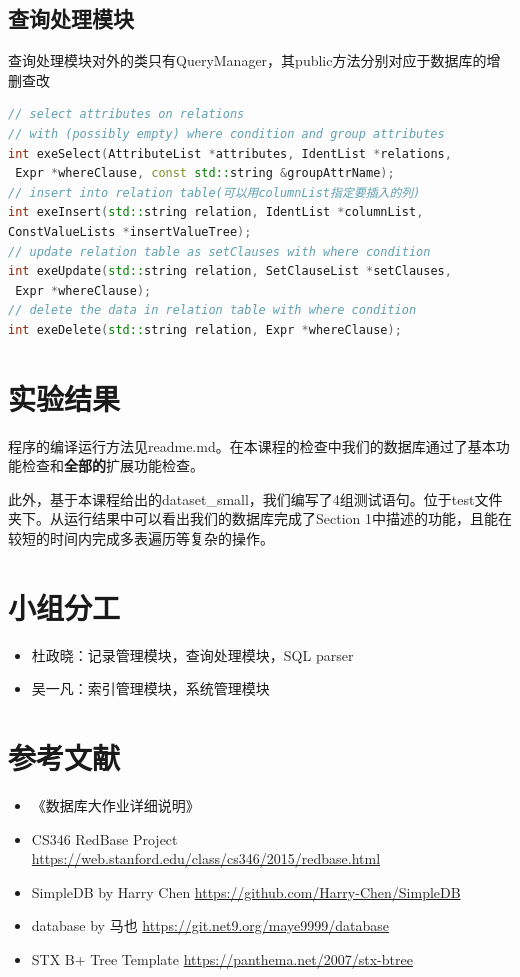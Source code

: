 \documentclass[11pt,UTF8]{report}
\begin{document}
\subsection{查询处理模块}
查询处理模块对外的类只有QueryManager，其public方法分别对应于数据库的增删查改
\begin{lstlisting}[language=C++]
// select attributes on relations 
// with (possibly empty) where condition and group attributes
int exeSelect(AttributeList *attributes, IdentList *relations,
 Expr *whereClause, const std::string &groupAttrName);
// insert into relation table(可以用columnList指定要插入的列)
int exeInsert(std::string relation, IdentList *columnList, 
ConstValueLists *insertValueTree);
// update relation table as setClauses with where condition
int exeUpdate(std::string relation, SetClauseList *setClauses,
 Expr *whereClause);
// delete the data in relation table with where condition
int exeDelete(std::string relation, Expr *whereClause);

\end{lstlisting}


\section{实验结果}
程序的编译运行方法见readme.md。在本课程的检查中我们的数据库通过了基本功能检查和\textbf{全部的}扩展功能检查。

此外，基于本课程给出的dataset\_small，我们编写了4组测试语句。位于test文件夹下。从运行结果中可以看出我们的数据库完成了Section 1中描述的功能，且能在较短的时间内完成多表遍历等复杂的操作。

\section{小组分工}
\begin{itemize}
	\item 杜政晓：记录管理模块，查询处理模块，SQL parser
	\item 吴一凡：索引管理模块，系统管理模块
\end{itemize}

\section{参考文献}
\begin{itemize}
	\item 《数据库大作业详细说明》
	\item CS346 RedBase Project \url{https://web.stanford.edu/class/cs346/2015/redbase.html}
	\item SimpleDB by Harry Chen \url{https://github.com/Harry-Chen/SimpleDB}
	\item database by 马也 \url{https://git.net9.org/maye9999/database}
	\item STX B+ Tree Template \url{https://panthema.net/2007/stx-btree}
\end{itemize}
\end{document}
